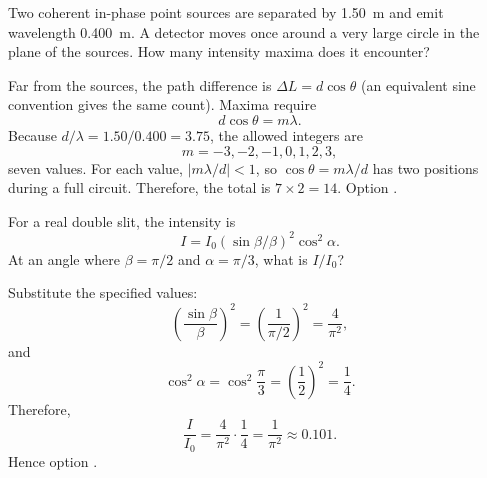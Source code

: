 \begin{quizquestion}[
  id=phy104-wave-055,
  topic=waves-and-sound,
  difficulty=challenge,
  marks=3,
  correct=D,
  tags={two-source-interference,path-difference,maxima},
  outcome={Count far-field maxima from two coherent sources}
]
  Two coherent in-phase point sources are separated by \SI{1.50}{m} and emit wavelength \SI{0.400}{m}. A detector moves once around a very large circle in the plane of the sources. How many intensity maxima does it encounter?
\end{quizquestion}
\begin{quizsolution}
  Far from the sources, the path difference is \(\Delta L=d\cos\theta\) (an equivalent sine convention gives the same count). Maxima require
    \[
      d\cos\theta=m\lambda.
    \]
    Because \(d/\lambda=1.50/0.400=3.75\), the allowed integers are
    \[
      m=-3,-2,-1,0,1,2,3,
    \]
    seven values. For each value, \(|m\lambda/d|<1\), so \(\cos\theta=m\lambda/d\) has two positions during a full circuit. Therefore, the total is \(7\times2=14\). Option \textbf{\quizcorrectletter}.
\end{quizsolution}

\begin{quizquestion}[
  id=phy104-opt-056,
  topic=optics,
  difficulty=challenge,
  marks=3,
  correct=B,
  tags={double-slit,diffraction-envelope,intensity},
  outcome={Evaluate real double-slit intensity at a specified angle}
]
  For a real double slit, the intensity is \[I=I_0{(\sin\beta/\beta)}^2\cos^2\alpha.\] At an angle where \(\beta=\pi/2\) and \(\alpha=\pi/3\), what is \(I/I_0\)?
\end{quizquestion}
\begin{quizsolution}
  Substitute the specified values:
    \[
      {\left(\frac{\sin\beta}{\beta}\right)}^2
      ={\left(\frac{1}{\pi/2}\right)}^2
      =\frac{4}{\pi^2},
    \]
    and
    \[
      \cos^2\alpha=\cos^2\frac{\pi}{3}={\left(\frac12\right)}^2=\frac14.
    \]
    Therefore,
    \[
      \frac{I}{I_0}=\frac{4}{\pi^2}\cdot\frac14=\frac{1}{\pi^2}\approx0.101.
    \]
    Hence option \textbf{\quizcorrectletter}.
\end{quizsolution}

